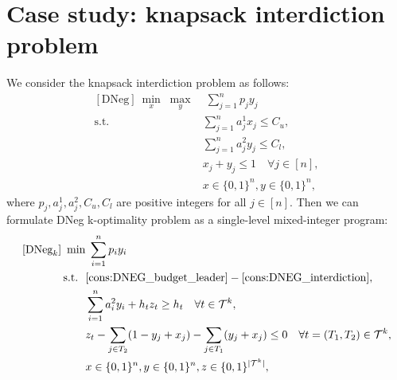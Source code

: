 \documentclass[11pt]{article}
\newcommand{\T}{\mathcal{T}}
\begin{document}
%


\section{Case study: knapsack interdiction problem}
We consider the knapsack interdiction problem \cite{caprara2016bilevel,denegre2011interdiction} as follows:
\begin{subequations}
	\begin{align}
	[\text{DNeg}]~ \min_x \; \max_y& \; \sum_{j=1}^n p_jy_j \nonumber \\
	\text{s.t.~~}& \sum_{j=1}^n a^1_j x_j \leq C_u, \label{cons:DNEG_budget_leader}\\
	& \sum_{j=1}^n a^2_jy_j \leq C_l,\\
	& x_j + y_j \leq 1 \quad \forall j\in [n], \label{cons:DNEG_interdiction} \\
	& x \in \{0, 1\}^n, y\in \{0,1\}^n, \nonumber
	\end{align}
\end{subequations}
where $p_j,a_j^1, a_j^2, C_u, C_l$ are positive integers for all $j \in [n]$. Then we can formulate DNeg k-optimality problem as a single-level mixed-integer program:
\begin{subequations}
	\begin{align}
	[\text{DNeg}_k] ~ \min& \; \sum_{i=1}^n p_iy_i \nonumber \\
	\text{s.t.~~}& \eqref{cons:DNEG_budget_leader} - \eqref{cons:DNEG_interdiction}, \nonumber\\
	& \sum_{i=1}^n a_i^2 y_i + h_tz_t \geq h_t \quad \forall t\in \T^k, \label{eq:DNEG_interdiction_kopt2} \\
	& z_t - \sum_{j\in T_2} (1 - y_j + x_j) - \sum_{j\in T_1} ( y_j + x_j) \leq 0 \quad \forall t = (T_1, T_2) \in \T^k, \label{eq:DNEG_interdiction_kopt1}\\
	& x \in \{0, 1\}^n, y\in \{0,1\}^n, z\in \{0,1\}^{|\T^k|},
	\end{align}
\end{subequations}
\end{document}
